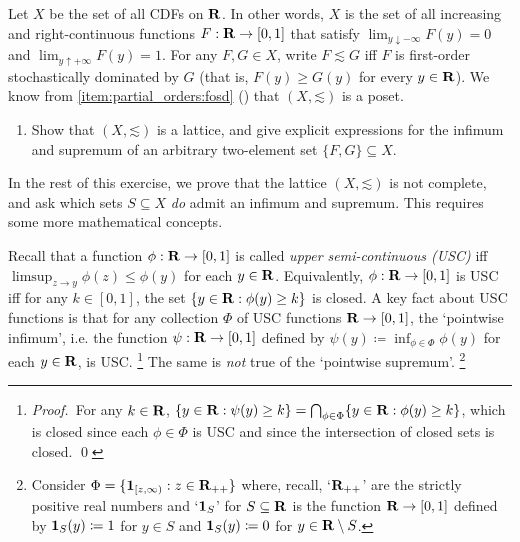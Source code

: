 \begin{exercise}[brace yourself]
	\label{exercise:CDFs_lattice}
	Let $X$ be the set of all CDFs on $\mathbf{R}$. In other words, $X$ is the set of all increasing and right-continuous functions $F : \mathbf{R} \to [0,1]$ that satisfy $\lim_{y \downarrow -\infty} F(y) = 0$ and $\lim_{y \uparrow +\infty} F(y) = 1$.
	For any $F,G \in X$, write $F \lesssim G$ iff $F$ is first-order stochastically dominated by $G$ (that is, $F(y) \geq G(y)$ for every $y \in \mathbf{R}$). We know from \ref{item:partial_orders:fosd} () that $(X,\mathord{\lesssim})$ is a poset.

	\begin{enumerate}[label=(\alph*)]
	
		\item Show that $(X,\mathord{\lesssim})$ is a lattice, and give explicit expressions for the infimum and supremum of an arbitrary two-element set $\{F,G\} \subseteq X$.
	
	\end{enumerate}
	In the rest of this exercise, we prove that the lattice $(X,\mathord{\lesssim})$ is not complete, and ask which sets $S \subseteq X$ \emph{do} admit an infimum and supremum. This requires some more mathematical concepts.

	Recall that a function $\phi : \mathbf{R} \to [0,1]$ is called \emph{upper semi-continuous (USC)} iff $\limsup_{z \to y} \phi(z) \leq \phi(y)$ for each $y \in \mathbf{R}$. Equivalently, $\phi : \mathbf{R} \to [0,1]$ is USC iff for any $k \in [0,1]$, the set $\left\{ y \in \R : \phi(y) \geq k \right\}$ is closed.
	A key fact about USC functions is that for any collection $\Phi$ of USC functions $\mathbf{R} \to [0,1]$, the `pointwise infimum', i.e. the function $\psi : \mathbf{R} \to [0,1]$ defined by $\psi(y) \coloneqq \inf_{\phi \in \Phi} \phi(y)$ for each $y \in \mathbf{R}$, is USC.%
		\footnote{\emph{Proof.}\, For any $k \in \mathbf{R}$, $\left\{ y \in \R : \psi(y) \geq k \right\} = \Intersect_{\phi \in \Phi} \left\{ y \in \R : \phi(y) \geq k \right\}$, which is closed since each $\phi \in \Phi$ is USC and since the intersection of closed sets is closed. \qed}
	The same is \emph{not} true of the `pointwise supremum'.%
		\footnote{Consider $\Phi = \{ \boldsymbol{1}_{[z,\infty)} : z \in \mathbf{R}_{++} \}$ where, recall, `$\mathbf{R}_{++}$' are the strictly positive real numbers and `$\boldsymbol{1}_S$' for $S \subseteq \mathbf{R}$ is the function $\mathbf{R} \to [0,1]$ defined by $\boldsymbol{1}_S(y) \coloneqq 1$ for $y \in S$ and $\boldsymbol{1}_S(y) \coloneqq 0$ for $y \in \mathbf{R} \setminus S$.}


\end{exercise}
